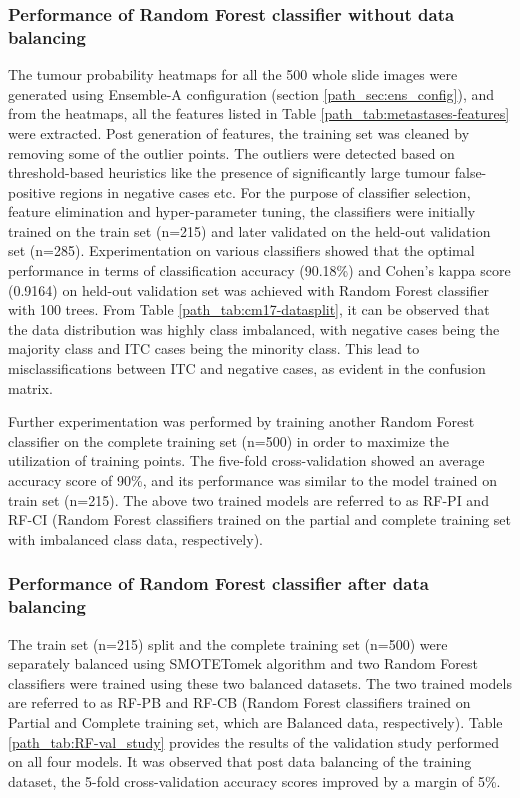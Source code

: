 \documentclass[times,twocolumn,final,authoryear]{tmp}
\begin{document}
\subsubsection{Performance of Random Forest classifier without data balancing}
The tumour probability heatmaps for all the 500 whole slide images were generated using Ensemble-A configuration (section \ref{path_sec:ens_config}), and from the heatmaps, all the features listed in Table \ref{path_tab:metastases-features} were extracted. Post generation of features, the training set was cleaned by removing some of the outlier points. The outliers were detected based on threshold-based heuristics like the presence of significantly large tumour false-positive regions in negative cases etc.
For the purpose of classifier selection, feature elimination and hyper-parameter tuning, the classifiers were initially trained on the train set (n=215) and later validated on the held-out validation set (n=285). Experimentation on various classifiers showed that the optimal performance in terms of classification accuracy (90.18\%) and Cohen's kappa score (0.9164) on held-out validation set was achieved with Random Forest classifier with 100 trees. From Table \ref{path_tab:cm17-datasplit}, it can be observed that the data distribution was highly class imbalanced, with negative cases being the majority class and ITC cases being the minority class. This lead to misclassifications between ITC and negative cases, as evident in the confusion matrix. 



Further experimentation was performed by training another Random Forest classifier on the complete training set (n=500) in order to maximize the utilization of training points. The five-fold cross-validation showed an average accuracy score of 90\%, and its performance was similar to the model trained on train set (n=215).
The above two trained models are referred to as RF-PI and RF-CI (Random Forest classifiers trained on the partial and complete training set with imbalanced class data, respectively).



\subsubsection{Performance of Random Forest classifier after data balancing}
The train set (n=215) split and the complete training set (n=500) were separately balanced using SMOTETomek algorithm and two Random Forest classifiers were trained using these two balanced datasets. The two trained models are referred to as RF-PB and RF-CB (Random Forest classifiers trained on Partial and Complete training set, which are Balanced data, respectively). Table \ref{path_tab:RF-val_study} provides the results of the validation study performed on all four models. It was observed that post data balancing of the training dataset, the 5-fold cross-validation accuracy scores improved by a margin of 5\%.
\end{document}
